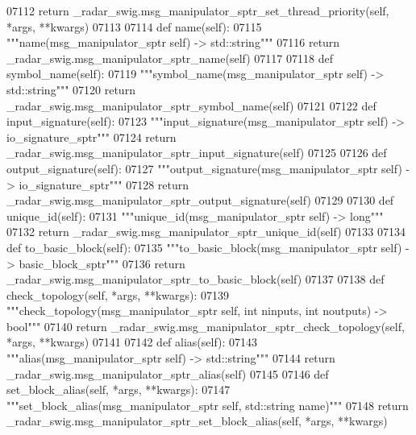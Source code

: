 \begin{DoxyCode}
{{{{{{{{{{{{{{{{{{{{{{{07112         \textcolor{keywordflow}{return} \_radar\_swig.msg\_manipulator\_sptr\_set\_thread\_priority(self, *args, **kwargs)
07113 
07114     \textcolor{keyword}{def }name(self):
07115         \textcolor{stringliteral}{"""name(msg\_manipulator\_sptr self) -> std::string"""}
07116         \textcolor{keywordflow}{return} \_radar\_swig.msg\_manipulator\_sptr\_name(self)
07117 
07118     \textcolor{keyword}{def }symbol_name(self):
07119         \textcolor{stringliteral}{"""symbol\_name(msg\_manipulator\_sptr self) -> std::string"""}
07120         \textcolor{keywordflow}{return} \_radar\_swig.msg\_manipulator\_sptr\_symbol\_name(self)
07121 
07122     \textcolor{keyword}{def }input_signature(self):
07123         \textcolor{stringliteral}{"""input\_signature(msg\_manipulator\_sptr self) -> io\_signature\_sptr"""}
07124         \textcolor{keywordflow}{return} \_radar\_swig.msg\_manipulator\_sptr\_input\_signature(self)
07125 
07126     \textcolor{keyword}{def }output_signature(self):
07127         \textcolor{stringliteral}{"""output\_signature(msg\_manipulator\_sptr self) -> io\_signature\_sptr"""}
07128         \textcolor{keywordflow}{return} \_radar\_swig.msg\_manipulator\_sptr\_output\_signature(self)
07129 
07130     \textcolor{keyword}{def }unique_id(self):
07131         \textcolor{stringliteral}{"""unique\_id(msg\_manipulator\_sptr self) -> long"""}
07132         \textcolor{keywordflow}{return} \_radar\_swig.msg\_manipulator\_sptr\_unique\_id(self)
07133 
07134     \textcolor{keyword}{def }to_basic_block(self):
07135         \textcolor{stringliteral}{"""to\_basic\_block(msg\_manipulator\_sptr self) -> basic\_block\_sptr"""}
07136         \textcolor{keywordflow}{return} \_radar\_swig.msg\_manipulator\_sptr\_to\_basic\_block(self)
07137 
07138     \textcolor{keyword}{def }check_topology(self, *args, **kwargs):
07139         \textcolor{stringliteral}{"""check\_topology(msg\_manipulator\_sptr self, int ninputs, int noutputs) -> bool"""}
07140         \textcolor{keywordflow}{return} \_radar\_swig.msg\_manipulator\_sptr\_check\_topology(self, *args, **kwargs)
07141 
07142     \textcolor{keyword}{def }alias(self):
07143         \textcolor{stringliteral}{"""alias(msg\_manipulator\_sptr self) -> std::string"""}
07144         \textcolor{keywordflow}{return} \_radar\_swig.msg\_manipulator\_sptr\_alias(self)
07145 
07146     \textcolor{keyword}{def }set_block_alias(self, *args, **kwargs):
07147         \textcolor{stringliteral}{"""set\_block\_alias(msg\_manipulator\_sptr self, std::string name)"""}
07148         \textcolor{keywordflow}{return} \_radar\_swig.msg\_manipulator\_sptr\_set\_block\_alias(self, *args, **kwargs)
}}}}}}}}}}}}}}}}}}}}}}}
\end{DoxyCode}
